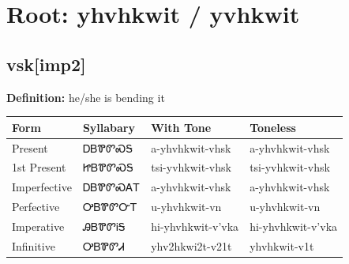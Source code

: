 \documentclass{article}%
\begin{document}
%
\normalsize%
\section*{Root: yhvhkwit / yvhkwit}%
\subsection*{vsk[imp2]}%
\textbf{Definition: }%
he/she is bending it%
\\[0.5em]%
\begin{tabular}{|l|l|l|l|}%
\hline%
\textbf{Form}&\textbf{Syllabary}&\textbf{With Tone}&\textbf{Toneless}\\%
\hline%
Present&ᎠᏴᏈᏛᏍᎦ&a{-}yhvhkwit{-}vhsk&a{-}yhvhkwit{-}vhsk\\%
1st Present&ᏥᏴᏈᏛᏍᎦ&tsi{-}yvhkwit{-}vhsk&tsi{-}yvhkwit{-}vhsk\\%
Imperfective&ᎠᏴᏈᏛᏍᎪᎢ&a{-}yhvhkwit{-}vhsk&a{-}yhvhkwit{-}vhsk\\%
Perfective&ᎤᏴᏈᏛᏅᎢ&u{-}yhvhkwit{-}vn&u{-}yhvhkwit{-}vn\\%
Imperative&ᎯᏴᏈᏛᎥᎦ&hi{-}yhvhkwit{-}v'vka&hi{-}yhvhkwit{-}v'vka\\%
Infinitive&ᎤᏴᏈᏛᏗ&yhv2hkwi2t{-}v21t&yhvhkwit{-}v1t\\%
\hline%
\end{tabular}%
\\[1em]%
\end{document}
